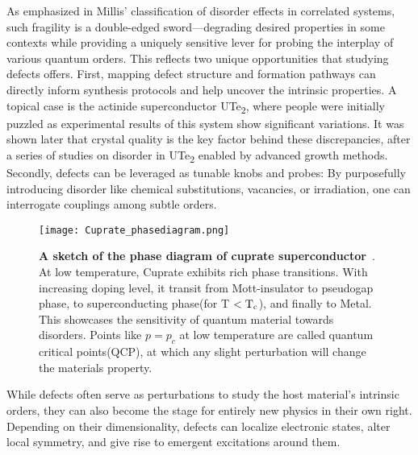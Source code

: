 As emphasized in Millis’ classification of disorder effects in correlated systems\cite{millisClassificationEffectsDisorder2003}, such fragility is a double-edged sword—degrading desired properties in some contexts while providing a uniquely sensitive lever for probing the interplay of various quantum orders. This reflects two unique opportunities that studying defects offers. First, mapping defect structure and formation pathways can directly inform synthesis protocols and help uncover the intrinsic properties. A topical case is the actinide superconductor UTe\textsubscript{2}, where people were initially puzzled as experimental results of this system show significant variations. It was shown later that crystal quality is the key factor behind these discrepancies, after a series of studies on disorder in UTe\textsubscript{2} enabled by advanced growth methods\cite{aishwaryaMeltingChargeDensity2024}\cite{xueAdvancesSingleCrystal2025}. Secondly, defects can be leveraged as tunable knobs and probes: By purposefully introducing disorder like chemical substitutions, vacancies, or irradiation, one can interrogate couplings among subtle orders\cite{fradkinIntertwinedOrdersPhysics2025}\cite{ohDisentanglingIntertwinedOrders2025}.   

\begin{figure} 
	\centering
	\texttt{[image: Cuprate\_phasediagram.png]}
	\caption[\textbf{A sketch of the phase diagram of cuprate superconductor}]{\textbf{A sketch of the phase diagram of cuprate superconductor}~\cite{tailleferScatteringPairingCuprate2010}. At low temperature, Cuprate exhibits rich phase transitions. With increasing doping level, it transit from Mott-insulator to pseudogap phase, to superconducting phase(for T $< \text{T}\textsubscript{c}$), and finally to Metal. This showcases the sensitivity of quantum material towards disorders. Points like $p=p_c$ at low temperature are called quantum critical points(QCP), at which any slight perturbation will change the materials property.}
	\label{fig:cuprate_pd}
\end{figure}

While defects often serve as perturbations to study the host material’s intrinsic orders, they can also become the stage for entirely new physics in their own right. Depending on their dimensionality, defects can localize electronic states, alter local symmetry, and give rise to emergent excitations around them.

